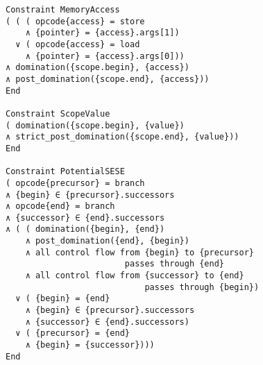 \begin{figure}[p]
\begin{lstlisting}[language=CAnDL,basicstyle=\linespread{0.8}\ttfamily,
                   firstnumber=195]
Constraint MemoryAccess
( ( ( opcode{access} = store
    ∧ {pointer} = {access}.args[1])
  ∨ ( opcode{access} = load
    ∧ {pointer} = {access}.args[0]))
∧ domination({scope.begin}, {access})
∧ post_domination({scope.end}, {access}))
End

Constraint ScopeValue
( domination({scope.begin}, {value})
∧ strict_post_domination({scope.end}, {value}))
End

Constraint PotentialSESE
( opcode{precursor} = branch
∧ {begin} ∈ {precursor}.successors
∧ opcode{end} = branch
∧ {successor} ∈ {end}.successors
∧ ( ( domination({begin}, {end})
    ∧ post_domination({end}, {begin})
    ∧ all control flow from {begin} to {precursor}
                        passes through {end}
    ∧ all control flow from {successor} to {end}
                            passes through {begin})
  ∨ ( {begin} = {end}
    ∧ {begin} ∈ {precursor}.successors
    ∧ {successor} ∈ {end}.successors)
  ∨ ( {precursor} = {end}
    ∧ {begin} = {successor})))
End
\end{lstlisting}
\end{figure}
